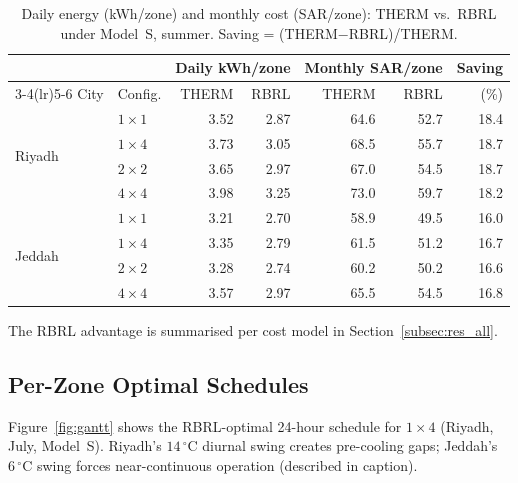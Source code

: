 \documentclass[3p,number]{elsarticle}
\let\oldsubsection\subsection
\renewcommand{\subsection}{\FloatBarrier\oldsubsection}
\begin{document}
\begin{table}[!t]
\centering
\caption{Daily energy (kWh/zone) and monthly cost (SAR/zone): THERM
vs.\ RBRL under Model~S, summer. Saving = (THERM$-$RBRL)/THERM.}
\label{tab:consumption}
\setlength{\tabcolsep}{3.5pt}
\begin{tabularx}{\linewidth}{@{}lXrrrrr@{}}
\toprule
& & \multicolumn{2}{c}{Daily kWh/zone} &
    \multicolumn{2}{c}{Monthly SAR/zone} & Saving \\
\cmidrule(lr){3-4}\cmidrule(lr){5-6}
City & Config. & THERM & RBRL & THERM & RBRL & (\%) \\
\midrule
\multirow{4}{*}{Riyadh}
  & $1\times1$ & 3.52 & 2.87 & 64.6 & 52.7 & 18.4 \\
  & $1\times4$ & 3.73 & 3.05 & 68.5 & 55.7 & 18.7 \\
  & $2\times2$ & 3.65 & 2.97 & 67.0 & 54.5 & 18.7 \\
  & $4\times4$ & 3.98 & 3.25 & 73.0 & 59.7 & 18.2 \\
\midrule
\multirow{4}{*}{Jeddah}
  & $1\times1$ & 3.21 & 2.70 & 58.9 & 49.5 & 16.0 \\
  & $1\times4$ & 3.35 & 2.79 & 61.5 & 51.2 & 16.7 \\
  & $2\times2$ & 3.28 & 2.74 & 60.2 & 50.2 & 16.6 \\
  & $4\times4$ & 3.57 & 2.97 & 65.5 & 54.5 & 16.8 \\
\bottomrule
\end{tabularx}
\end{table}
 
The RBRL advantage is summarised per cost model in Section~\ref{subsec:res_all}.
 
\subsection{Per-Zone Optimal Schedules}
\label{subsec:perzone}
 
Figure~\ref{fig:gantt} shows the RBRL-optimal 24-hour schedule for $1\!\times\!4$ (Riyadh, July, Model~S).
Riyadh's $14\,^\circ$C diurnal swing creates pre-cooling gaps; Jeddah's $6\,^\circ$C swing forces near-continuous operation (described in caption).
 
\end{document}
